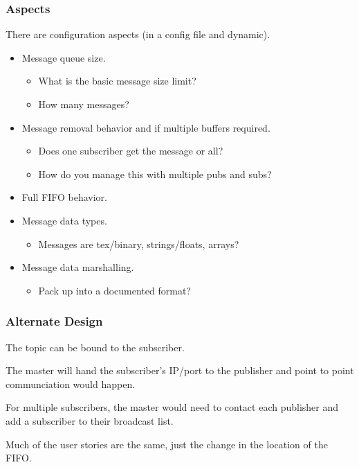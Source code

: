 \documentclass[xcolor=svgnames]{beamer}
\begin{document}
\begin{frame}[fragile]
  \frametitle{Aspects}

There are configuration aspects (in a config file and dynamic).
\begin{itemize}
\item Message queue size.
\begin{itemize}
\item What is the basic message size limit?
\item How many messages?
\end{itemize}

\item Message removal behavior and if multiple buffers required.
\begin{itemize}
\item Does one subscriber get the message or all?
\item How do you manage this with multiple pubs and subs?
\end{itemize}

\item Full FIFO behavior.
\item Message data types.
\begin{itemize}
\item Messages are tex/binary, strings/floats, arrays?
\end{itemize}

\item Message data marshalling.
\begin{itemize}
\item Pack up into a documented format?
\end{itemize}

\end{itemize}

\end{frame}



\begin{frame}[fragile]
  \frametitle{Alternate Design}

The topic can be bound to the subscriber.
\vfill

The master will hand the subscriber's IP/port to the publisher and point to point communciation would happen. \vfill

   For multiple subscribers, the master would need to contact each publisher and add a subscriber to their broadcast list.\vfill
   
Much of the user stories are the same, just the change in the location of the FIFO.

\end{frame}
\end{document}
